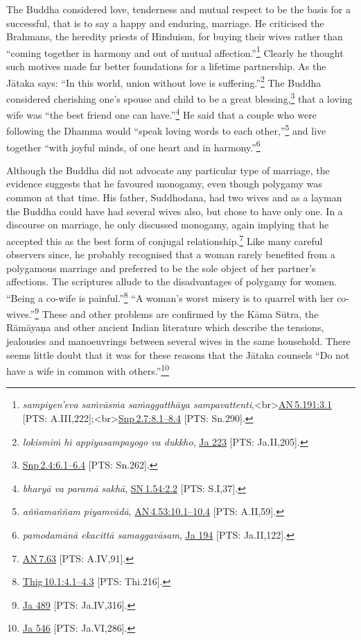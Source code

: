 \documentclass[10pt, openright]{book}
\begin{document}
The Buddha considered love, tenderness and mutual respect to be the basis for a successful, that is to say a happy and enduring, marriage. He criticised the Brahmans, the heredity priests of Hinduism, for buying their wives rather than “coming together in harmony and out of mutual affection.”\footnote {\textit{sampiyen’eva saṁvāsṁa saṁaggatthāya sampavattenti},<br>\href{https://suttacentral.net/an5.191/en/sujato\#3.1}{AN 5.191:3.1} [PTS: A.III,222];<br>\href{https://suttacentral.net/snp2.7/en/sujato\#8.1}{Snp 2.7:8.1–8.4} [PTS: Sn.290].} Clearly he thought such motives made far better foundations for a lifetime partnership. As the Jātaka says: “In this world, union without love is suffering.”\footnote {\textit{lokismiṁ hi appiyasampayogo va dukkho}, \href{https://suttacentral.net/ja223/en/rouse?reference=main/pts#pts-vp-pli205}{Ja 223} [PTS: Ja.II,205].} The Buddha considered cherishing one’s spouse and child to be a great blessing,\footnote {\href{https://suttacentral.net/snp2.4/en/sujato\#6.1}{Snp 2.4:6.1–6.4} [PTS: Sn.262].} that a loving wife was “the best friend one can have.”\footnote {\textit{bharyā va paramā sakhā}, \href{https://suttacentral.net/sn1.54/en/sujato\#2.2}{SN 1.54:2.2} [PTS: S.I,37].} He said that a couple who were following the Dhamma would “speak loving words to each other,”\footnote {\textit{aññamaññam piyamvādā}, \href{https://suttacentral.net/an4.53/en/sujato\#10.1}{AN 4.53:10.1–10.4} [PTS: A.II,59].} and live together “with joyful minds, of one heart and in harmony.”\footnote {\textit{pamodamānā ekacittā samaggavāsam}, \href{https://suttacentral.net/ja194/en/rouse?reference=main/pts#pts-vp-pli122}{Ja 194} [PTS: Ja.II,122].}


Although the Buddha did not advocate any particular type of marriage, the evidence suggests that he favoured monogamy, even though polygamy was common at that time. His father, Suddhodana, had two wives and as a layman the Buddha could have had several wives also, but chose to have only one. In a discourse on marriage, he only discussed monogamy, again implying that he accepted this as the best form of conjugal relationship.\footnote {\href{https://suttacentral.net/an7.63/en/sujato}{AN 7.63} [PTS: A.IV,91].} Like many careful observers since, he probably recognised that a woman rarely benefited from a polygamous marriage and preferred to be the sole object of her partner’s affections. The scriptures allude to the disadvantages of polygamy for women. “Being a co-wife is painful.”\footnote {\href{https://suttacentral.net/thig10.1/en/sujato\#4.1}{Thig 10.1:4.1–4.3} [PTS: Thi.216].} “A woman’s worst misery is to quarrel with her co-wives.”\footnote {\href{https://suttacentral.net/ja489/en/rouse?reference=main/pts#pts-vp-pli316}{Ja 489} [PTS: Ja.IV,316].} These and other problems are confirmed by the Kāma Sūtra, the Rāmāyaṇa and other ancient Indian literature which describe the tensions, jealousies and manoeuvrings between several wives in the same household. There seems little doubt that it was for these reasons that the Jātaka counsels “Do not have a wife in common with others.”\footnote {\href{https://suttacentral.net/ja546/en/cowell-rouse?reference=main/pts#pts-vp-pli286}{Ja 546} [PTS: Ja.VI,286].}
\end{document}
